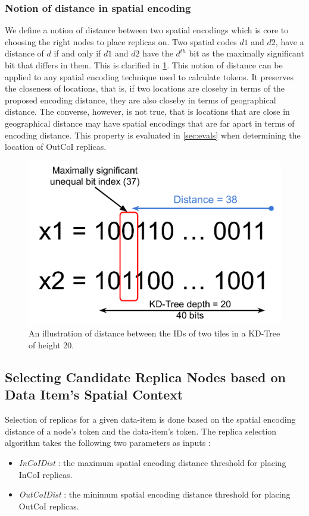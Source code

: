 \subsubsection{Notion of distance in spatial encoding}
\par We define a notion of distance between two spatial encodings which is core to choosing the right nodes to place replicas on. Two spatial codes $d1$ and $d2$, have a distance of $d$ if and only if $d1$ and $d2$ have the $d^{th}$ bit as the maximally significant bit that differs in them. This is clarified in \cref{fig:geohashdist}. This notion of distance can be applied to any spatial encoding technique used to calculate tokens. It preserves the closeness of locations, that is, if two locations are closeby in terms of the proposed encoding distance, they are also closeby in terms of geographical distance. The converse, however, is not true, that is locations that are close in geographical distance may have spatial encodings that are far apart in terms of encoding distance. This property is evaluated in \cref{sec:evals} when determining the location of OutCoI replicas.
\begin{figure}
\centering
\includegraphics[width=0.8\columnwidth]{figures/fogstore/coi_distance.pdf}
\caption{An illustration of distance between the IDs of two tiles in a KD-Tree of height 20.}
\label{fig:geohashdist}
\end{figure}

\subsection{Selecting Candidate Replica Nodes based on Data Item's Spatial Context}
Selection of replicas for a given data-item is done based on the spatial encoding distance of a node's token and the data-item's token. The replica selection algorithm takes the following two parameters as inputs :
\begin{itemize}
\item \emph{InCoIDist} : the maximum spatial encoding distance threshold for placing InCoI replicas. 
\item \emph{OutCoIDist} : the minimum spatial encoding distance threshold for placing OutCoI replicas.  
\end{itemize}


